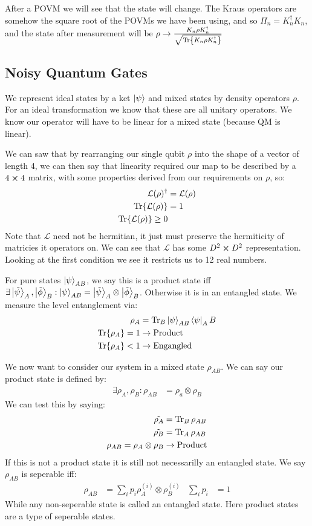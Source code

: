 After a POVM we will see that the state will change. 
The Kraus operators are somehow the square root of the POVMs we have been using, and so $\Pi_n = K_n^\dagger K_n$, and the state after measurement will be $\rho \to \frac{K_n\rho K_n^\dagger}{\sqrt{\Tr{K_n\rho K_n^\dagger}}}$
\subsection{Noisy Quantum Gates}
We represent ideal states by a ket $\ket{\psi}$ and mixed states by density operators $\rho$.
For an ideal transformation we know that these are all unitary operators. We know our operator will have to be linear for a mixed state (because QM is linear).

We can saw that by rearranging our single qubit $\rho$ into the shape of a vector of length 4, we can then say that linearity required our map to be described by a $4\cross4$ matrix, with some properties derived from our requirements on $\rho$, so:
\begin{align*}
	\mathcal{L}(\rho)^\dagger &= \mathcal{L}(\rho) \\
	\Tr{\mathcal{L}(\rho)} &= 1 \\
	\Tr{\mathcal{L}(\rho)} \geq 0
\end{align*}
Note that $\mathcal{L}$ need not be hermitian, it just must preserve the hermiticity of matricies it operators on. We can see that $\mathcal{L}$ has some $D^2\cross D^2$ representation.
Looking at the first condition we see it restricts us to 12 real numbers.

For pure states $\ket{\psi}_{AB}$, we say this is a product state iff $\exists \ket{\tilde{\psi}}_A,\ket{\tilde{\phi}}_B: \ket{\psi}_{AB} = \ket{\tilde{\psi}}_A \otimes\ket{\tilde{\phi}}_B$. Otherwise it is in an entangled state.
We measure the level entanglement via:
\begin{align*}
	\rho_A &= \Tr_B \ket{\psi}_{AB}\bra{\psi}_AB \\
	\Tr{\rho_A} = 1 &\to \text{Product} \\
	\Tr{\rho_A} < 1 &\to \text{Engangled}
\end{align*}

We now want to consider our system in a mixed state $\rho_{AB}$. We can say our product state is defined by:
\begin{align*}
	\exists \rho_A,\rho_B : \rho_{AB} &= \rho_a\otimes\rho_B
\end{align*}
We can test this by saying:
\begin{align*}
	\tilde{\rho_A} &= \Tr_B \rho_{AB} \\
	\tilde{\rho_B} &= \Tr_A \rho_{AB} \\
	\rho_{AB} = \rho_A \otimes \rho_B &\to \text{Product}
\end{align*}
If this is not a product state it is still not necessarilly an entangled state. We say $\rho_{AB}$ is seperable iff:
\begin{align*}
	\rho_{AB} &= \sum_i p_i \rho_A^{(i)}\otimes \rho_B^{(i)} & 
	\sum_i p_i &= 1
\end{align*}
While any non-seperable state is called an entangled state. Here product states are a type of seperable states.

